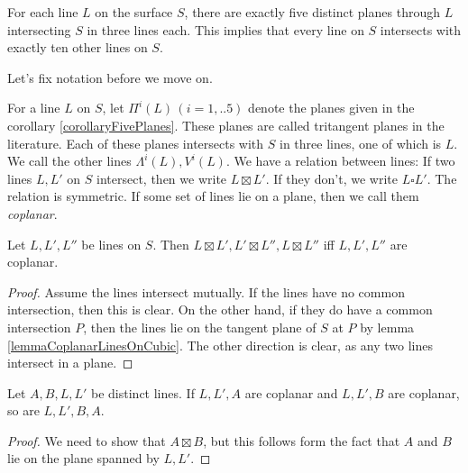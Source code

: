 \begin{corollary} \label{corollaryFivePlanes}
For each line $L$ on the surface $S$, there are exactly five distinct planes through $L$ intersecting $S$ in three lines each.
This implies that every line on $S$ intersects with exactly ten other lines on $S$.
\end{corollary}

Let's fix notation before we move on.
\begin{definition}
For a line $L$ on $S$, let $\Pi^i(L) \, (i=1,..5)$ denote the planes given in the corollary \ref{corollaryFivePlanes}. These planes are called tritangent planes in the literature.
Each of these planes intersects with $S$ in three lines, one of which is $L$. We call the other lines $\Lambda^i(L), V^i(L)$.
We have a relation between lines: If two lines $L,L'$ on $S$ intersect, then we write $L \boxtimes L'$.
If they don't,  we write $L\square L'$. The relation is symmetric.
If some set of lines lie on a plane, then we call them \emph{coplanar}.
\end{definition}

\begin{lemma}
Let $L,L',L''$ be lines on $S$. Then $L\boxtimes L', L' \boxtimes L'', L\boxtimes L''$ iff $L,L',L''$ are coplanar.
\end{lemma}
\begin{proof}
Assume the lines intersect mutually.
If the lines have no common intersection, then this is clear. On the other hand, if they do have a common intersection $P$, then the lines lie on the tangent plane of $S$ at $P$ by lemma \ref{lemmaCoplanarLinesOnCubic}.
The other direction is clear, as any two lines intersect in a plane.
\end{proof}

\begin{lemma}  \label{lemmaCoplanTrans}
Let $A,B,L,L'$ be distinct lines. If $L,L',A$ are coplanar and $L,L',B$ are coplanar, so are $L,L',B,A$.
\end{lemma}
\begin{proof}
We need to show that $A \boxtimes B$, but this follows form the fact that $A$ and $B$ lie on the plane spanned by $L,L'$.
\end{proof}

